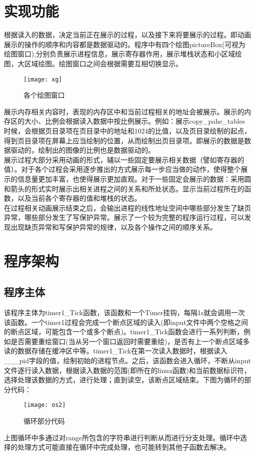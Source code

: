 \documentclass[]{report}
\begin{document}
\section{实现功能}
根据读入的数据，决定当前正在展示的过程，以及接下来将要展示的过程。即动画展示的操作的顺序和内容都是数据驱动的。程序中有四个绘图pictureBox(可视为绘图窗口),分别负责展示进程信息，展示寄存器作用，展示堆栈状态和小区域绘图，大区域绘图。绘图窗口之间会根据需要互相切换显示。\\
\begin{figure}[H]%
	\centering  %
	\texttt{[image: xg]}  
	\caption{各个绘图窗口}  %
	\label{fig444}
\end{figure}

展示内存相关内容时，表现的内存区中和当前过程相关的地址会被展示。展示的内存区的大小、比例会根据读入数据中按比例展示。例如：展示copy\_pahe\_tables时候，会根据页目录项在页目录中的地址和1024的比值，以及页目录绘制的起点，得到页目录项在屏幕上应当绘制的位置，从而绘制出页目录项。即展示的数据是数据驱动的，绘制出的图像的比例也是数据驱动的。\\

展示过程大部分采用动画的形式，辅以一些固定要展示相关数据（譬如寄存器的值）。对于各个过程会采用逐步推出的方式展示每一步应当做的动作，使得整个展示的信息量更加丰富，也使得展示更加直观。对于一些固定会展示的数据：采用圆和箭头的形式实时展示出相关进程之间的关系和所处状态。显示当前过程所在的函数，以及当前各个寄存器的值和堆栈的状态。\\

在过程相关动画展示结束之后，会输出进程的线性地址空间中哪些部分发生了缺页异常，哪些部分发生了写保护异常。展示了一个较为完整的程序运行过程，可以发现出现缺页异常和写保护异常的规律，以及各个操作之间的顺序关系。
\section{程序架构}
\subsection{程序主体}
该程序主体为timer1\_Tick函数，该函数和一个Timer挂钩，每隔1s就会调用一次该函数。一个timer1过程会完成一个断点区域的读入(即input文件中两个空格之间的断点区域，可能包含一个或多个断点)。timer1\_Tick函数会进行一系列判断，例如是否需要重绘窗口(当从另一个窗口返回时需要重绘)，是否有上一个断点区域多读的数据存储在缓冲区中等。timer1\_Tick在第一次读入数据时，根据读入\_\_\_pid字段的值，绘制初始的进程节点。之后，该函数会进入循环，不断从input文件逐行读入数据，根据读入数据的范围(即所在的linux函数)和当前数据标识符，选择处理该数据的方式，进行处理；直到读空，该断点区域结束。下图为循环的部分代码：
\begin{figure}[H]%
	\centering  %
	\texttt{[image: os2]}  
	\caption{循环部分代码}  %
	\label{fig4}
\end{figure}
上图循环中多通过对range所包含的字符串进行判断从而进行分支处理。循环中选择的处理方式可能直接在循环中完成处理，也可能转到其他子函数去解决。
\end{document}
